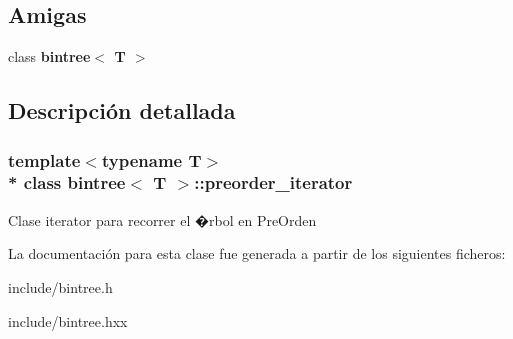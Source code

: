 \subsection*{Amigas}
\begin{DoxyCompactItemize}
\item 
class {\bfseries bintree$<$ T $>$}\hypertarget{classbintree_1_1preorder__iterator_a300e602ae13bd21fa092c5a5899e9eda}{}\label{classbintree_1_1preorder__iterator_a300e602ae13bd21fa092c5a5899e9eda}

\end{DoxyCompactItemize}


\subsection{Descripción detallada}
\subsubsection*{template$<$typename T$>$\\*
class bintree$<$ T $>$\+::preorder\+\_\+iterator}

Clase iterator para recorrer el �rbol en Pre\+Orden 

La documentación para esta clase fue generada a partir de los siguientes ficheros\+:\begin{DoxyCompactItemize}
\item 
include/bintree.\+h\item 
include/bintree.\+hxx\end{DoxyCompactItemize}
